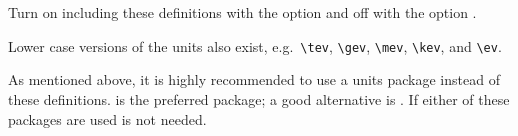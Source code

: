 \newpage
\section{}

Turn on including these definitions with the option  and off with the option .



\noindent Lower case versions of the units also exist, e.g.\ \verb|\tev|, \verb|\gev|, \verb|\mev|, \verb|\kev|, and
\verb|\ev|. 

As mentioned above, it is highly recommended to use a units package instead of
these definitions.  is the preferred package; a good alternative is .
If either of these packages are used  is not needed.

